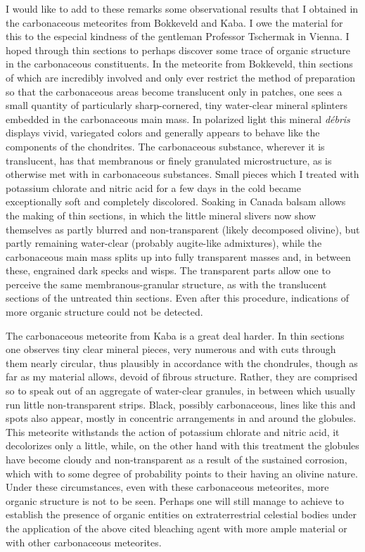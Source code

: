 \documentclass[a4paper, 12pt, oneside]{article}
\begin{document}
I would like to add to these remarks some observational results that I obtained in the carbonaceous meteorites from Bokkeveld and Kaba. I owe the material for this to the especial kindness of the gentleman Professor Tschermak in Vienna. I hoped through thin sections to perhaps discover some trace of organic structure in the carbonaceous constituents. In the meteorite from Bokkeveld, thin sections of which are incredibly involved and only ever restrict the method of preparation so that the carbonaceous areas become translucent only in patches, one sees a small quantity of particularly sharp-cornered, tiny water-clear mineral splinters embedded in the carbonaceous main mass. In polarized light this mineral \emph{débris} displays vivid, variegated colors and generally appears to behave like the components of the chondrites. The carbonaceous substance, wherever it is translucent, has that membranous or finely granulated microstructure, as is otherwise met with in carbonaceous substances. Small pieces which I treated with potassium chlorate and nitric acid for a few days in the cold became exceptionally soft and completely discolored. Soaking in Canada balsam allows the making of thin sections, in which the little mineral slivers now show themselves as partly blurred and non-transparent (likely decomposed olivine), but partly remaining water-clear (probably augite-like admixtures), while the carbonaceous main mass splits up into fully transparent masses and, in between these, engrained dark specks and wisps. The transparent parts allow one to perceive the same membranous-granular structure, as with the translucent sections of the untreated thin sections. Even after this procedure, indications of more organic structure could not be detected.

The carbonaceous meteorite from Kaba is a great deal harder. In thin sections one observes tiny clear mineral pieces, very numerous and with cuts through them nearly circular, thus plausibly in accordance with the chondrules, though as far as my material allows, devoid of fibrous structure. Rather, they are comprised so to speak out of an aggregate of water-clear granules, in between which usually run little non-transparent strips. Black, possibly carbonaceous, lines like this and spots also appear, mostly in concentric arrangements in and around the globules. This meteorite withstands the action of potassium chlorate and nitric acid, it decolorizes only a little, while, on the other hand with this treatment the globules have become cloudy and non-transparent as a result of the sustained corrosion, which with to some degree of probability points to their having an olivine nature. Under these circumstances, even with these carbonaceous meteorites, more organic structure is not to be seen. Perhaps one will still manage to achieve to establish the presence of organic entities on extraterrestrial celestial bodies under the application of the above cited bleaching agent with more ample material or with other carbonaceous meteorites.
\clearpage
\end{document}
